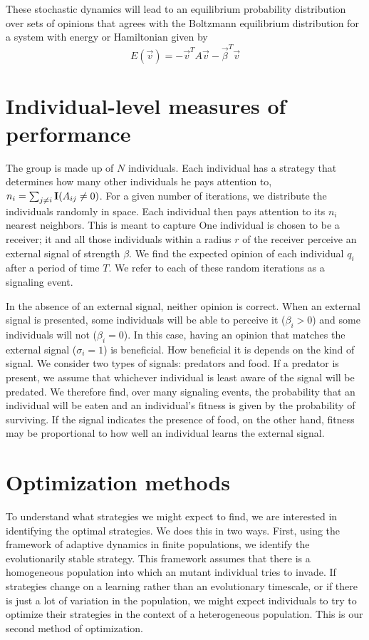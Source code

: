 \documentclass{article}
\begin{document}
These stochastic dynamics will lead to an equilibrium probability distribution over sets of opinions that agrees with the Boltzmann equilibrium distribution for a system with energy or Hamiltonian given by 
\begin{equation*}
E(\vec{v})=-\vec{v}^TA\vec{v}-\vec{\beta}^T\vec{v}
\end{equation*}  

\section{Individual-level measures of performance}
The group is made up of $N$ individuals.  Each individual has a strategy that determines how many other individuals he pays attention to, $n_i=\sum_{j\neq i}{\bf I}(A_{ij}\neq 0)$.  For a given number of iterations, we distribute the individuals randomly in space.  Each individual then pays attention to its $n_i$ nearest neighbors.  This is meant to capture One individual is chosen to be a receiver; it and all those individuals within a radius $r$ of the receiver perceive an external signal of strength $\beta$.  We find the expected opinion of each individual $q_i$ after a period of time $T$.  We refer to each of these random iterations as a signaling event.

In the absence of an external signal, neither opinion is correct.  When an external signal is presented, some individuals will be able to perceive it ($\beta_i>0$) and some individuals will not ($\beta_i=0$).  In this case, having an opinion that matches the external signal ($\sigma_i=1$) is beneficial.  How beneficial it is depends on the kind of signal.  We consider two types of signals: predators and food.  If a predator is present, we assume that whichever individual is least aware of the signal will be predated.  We therefore find, over many signaling events, the probability that an individual will be eaten and an individual's fitness is given by the probability of surviving.  If the signal indicates the presence of food, on the other hand, fitness may be proportional to how well an individual learns the external signal.  


\section{Optimization methods}
To understand what strategies we might expect to find, we are interested in identifying the optimal strategies.  We does this in two ways.  First, using the framework of adaptive dynamics in finite populations, we identify the evolutionarily stable strategy.  This framework assumes that there is a homogeneous population into which an mutant individual tries to invade.  If strategies change on a learning rather than an evolutionary timescale, or if there is just a lot of variation in the population, we might expect individuals to try to optimize their strategies in the context of a heterogeneous population.  This is our second method of optimization.
\end{document}
